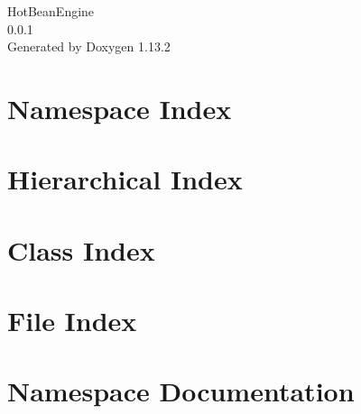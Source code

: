 \documentclass[twoside]{book}
\newcommand{\+}{\discretionary{\mbox{\scriptsize$\hookleftarrow$}}{}{}}
\newcommand{\clearemptydoublepage}{%
    \newpage{\pagestyle{empty}\cleardoublepage}%
  }
\begin{document}
  \raggedbottom
    \hypersetup{pageanchor=false,
                bookmarksnumbered=true,
                pdfencoding=unicode
               }
  \begin{titlepage}
  \vspace*{7cm}
  \begin{center}%
  {\Large Hot\+Bean\+Engine}\\
  [1ex]\large 0.\+0.\+1 \\
  \vspace*{1cm}
  {\large Generated by Doxygen 1.13.2}\\
  \end{center}
  \end{titlepage}
  \clearemptydoublepage
  \tableofcontents
  \clearemptydoublepage
  \hypersetup{pageanchor=true}
\chapter{Namespace Index}

\chapter{Hierarchical Index}

\chapter{Class Index}

\chapter{File Index}

\chapter{Namespace Documentation}





\end{document}
